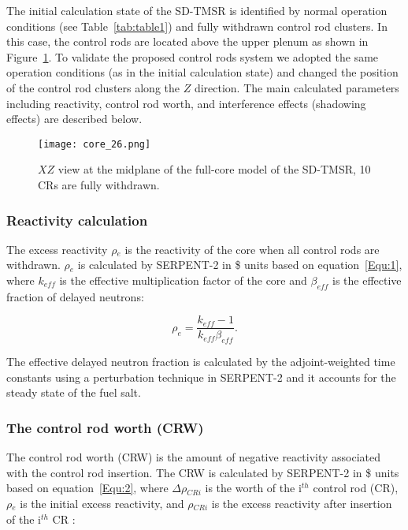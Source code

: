 The initial calculation state of the SD-TMSR is identified by normal operation 
conditions (see Table~\ref{tab:table1}) and fully withdrawn control rod 
clusters. In this case, the control rods are located above the upper plenum as 
shown in Figure~\ref{fig:core_26}. To validate the proposed control rods 
system we adopted the same operation conditions (as in the initial calculation 
state) and changed the position of the control rod clusters along the $Z$ 
direction. The main calculated parameters including reactivity, control rod 
worth, and interference effects (shadowing effects) are described below.

\begin{figure}[t!] %
	\centering
	\texttt{[image: core\_26.png]}
	\caption{$XZ$ view at the midplane of the full-core model of the SD-TMSR, 10 CRs are fully withdrawn.}
	\label{fig:core_26}
\end{figure}

\subsubsection{Reactivity calculation}

The excess reactivity $\rho$$_e$ is the reactivity of the core when all control rods are withdrawn. $\rho$$_e$ is calculated by SERPENT-2 in \$ units based on equation~\ref{Equ:1}, where $k_{eff}$ is the effective multiplication factor of the core and $\beta_{eff}$ is the effective fraction of delayed neutrons:

\begin{equation}
\label{Equ:1}
{{\rho}_{e}}=\dfrac{{k_{eff}}-1}{{k_{eff}}{{\beta}_{eff}}}.
\end{equation}

The effective delayed neutron fraction is calculated by the adjoint-weighted time constants using a perturbation technique in SERPENT-2 \cite{leppanen2014calculation} and it accounts for the steady state of the fuel salt.

\subsubsection{The control rod worth (CRW)}

The control rod worth (CRW) is the amount of negative reactivity associated with the control rod insertion. The CRW is calculated by SERPENT-2 in \$ units based on equation~\ref{Equ:2}, where $\Delta\rho$$_{CRi}$ is the worth of the i$^{th}$ control rod (CR), $\rho$$_e$ is the initial excess reactivity, and $\rho$$_{CRi}$ is the excess reactivity after insertion of the i$^{th}$ CR \cite{vcerba2017optimization}:

